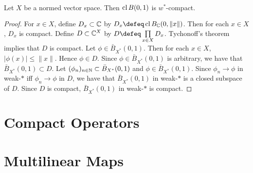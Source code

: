 \documentclass{book}
\begin{document}
	
	
	\begin{ex}  \\
		Let $X$ be a normed vector space. Then $\operatorname{cl} B(0,1)$ is $w^*$-compact. 
	\end{ex}

	\begin{proof}
		For $x \in X$, define $D_x \subset \mathbb{C}$ by $D_x \defeq \cl B_{\C}(0, \|x\|)$. Then for each $x \in X$, $D_x$ is compact. Define $D \subset \mathbb{C}^X$ by $D \defeq \prod\limits_{x \in X} D_x$. Tychonoff's theorem implies that $D$ is compact. Let $\phi \in \bar{B}_{X^*}(0,1)$. Then for each $x \in X$, $|\phi(x)| \leq \|x\|$. Hence $\phi \in D$. Since $\phi \in \bar{B}_{X^*}(0,1)$ is arbitrary, we have that $\bar{B}_{X^*}(0,1) \subset D$. Let $(\phi_n)_{n \in \mathbb{N}} \subset \bar{B}_{X^*}(0,1)$ and $\phi \in \bar{B}_{X^*}(0,1)$. Since $\phi_n \rightarrow \phi$ in weak-$*$ iff $\phi_n \rightarrow \phi$ in $D$, we have that $\bar{B}_{X^*}(0,1)$ in weak-$*$ is a closed subspace of $D$. Since $D$ is compact, $\bar{B}_{X^*}(0,1)$ in weak-$*$ is compact. 
		
 	\end{proof}







	
	
	
	






\newpage
\section{Compact Operators}


\begin{defn}

\end{defn}























	\newpage
	\section{Multilinear Maps}	
	
\end{document}
